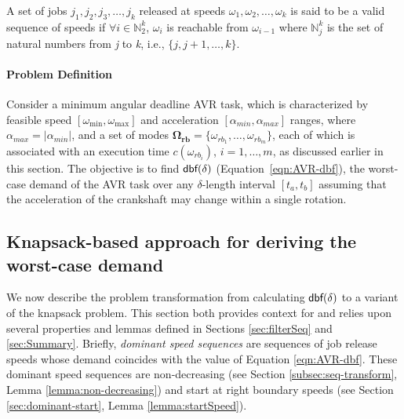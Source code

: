 \begin{definition}\label{def:valid-sequence}
A set of jobs ${j_1,j_2,j_3,\ldots,j_k}$ released at speeds $\omega_1,\omega_2,\ldots,\omega_k$ is said to be a valid sequence of speeds if 
$\forall i \in \mathbb{N}^k_2$, $\omega_i$ is reachable from $\omega_{i-1}$ where $\mathbb{N}^k_j$ is the set of natural numbers from \textit{j} to \textit{k}, i.e., $\{j,j+1,\ldots,k\}$.
\end{definition}
\paragraph{Problem Definition} 
Consider a minimum angular deadline AVR task, which is characterized by feasible speed $\left[\omega_{\min}, \omega_{\max}\right]$ and acceleration $\left[\alpha_{min}, \alpha_{max}\right]$ ranges, where $\alpha_{max} = |\alpha_{min}|$, and a set of modes $\mathbf{\Omega_{rb}}=\{\omega_{rb_1}, \ldots, \omega_{rb_m} \}$, each of which is associated with an execution time $c(\omega_{rb_i})$, $i = 1, \ldots, m$, as discussed earlier in this section.
The objective is to find $\mbox{\sf dbf}(\delta)$ (Equation~\ref{eqn:AVR-dbf}), the worst-case demand of the AVR task over any $\delta$-length interval $[t_a, t_b]$ assuming that the acceleration of the crankshaft may change within a single rotation.

\subsection{Knapsack-based approach for deriving the worst-case demand}
\label{sec:knapsack}

We now describe the problem transformation from calculating $\mbox{\sf dbf}(\delta)$ to a variant of the knapsack problem.
This section both provides context for and relies upon several  properties and  lemmas defined in Sections \ref{sec:filterSeq} and \ref{sec:Summary}.
Briefly, \textit{dominant speed sequences} are sequences of job release speeds whose demand %
coincides with the value of Equation \ref{eqn:AVR-dbf}.
These dominant speed sequences are non-decreasing (see Section \ref{subsec:seq-transform}, Lemma \ref{lemma:non-decreasing}) and start at right boundary speeds (see Section \ref{sec:dominant-start}, Lemma \ref{lemma:startSpeed}).

